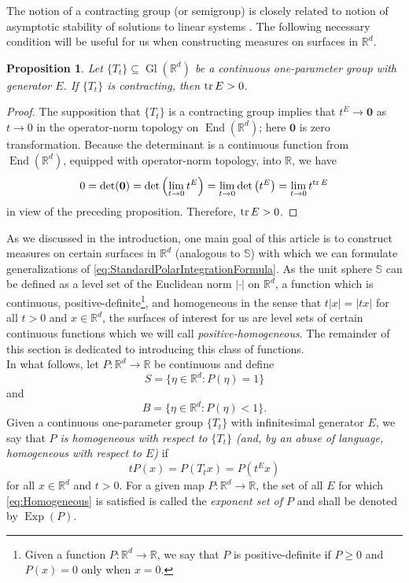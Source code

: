 \documentclass[11pt]{article}
\newtheorem{proposition}[theorem]{Proposition}
\newcommand\End{\operatorname{End}} %
\newcommand\Gl{\operatorname{Gl}} %
\newcommand\Exp{\operatorname{Exp}}
\renewcommand\det{\operatorname{det}}
\begin{document}
\noindent The notion of a contracting group (or semigroup) is closely related to notion of asymptotic stability of solutions to linear systems \cite{Braun1993}. The following necessary condition will be useful for us when constructing measures on surfaces in $\mathbb{R}^d$.

\begin{proposition}\label{prop:ContractingTrace}
Let $\{T_t\}\subseteq \Gl(\mathbb{R}^d)$ be a continuous one-parameter group with generator $E$. If $\{T_t\}$ is  contracting, then $\tr E>0$. 
\end{proposition}
\begin{proof}
The supposition that $\{T_t\}$ is a contracting group implies that $t^E\to \mathbf{0}$ as $t\to 0$ in the operator-norm topology on $\End(\mathbb{R}^d)$; here $\mathbf{0}$ is zero transformation. Because the determinant is a continuous function from $\End(\mathbb{R}^d)$, equipped with operator-norm topology, into $\mathbb{R}$, we have
\begin{equation*}
0=\det(\mathbf{0})=\det\left(\lim_{t\to 0}t^E\right)=\lim_{t\to 0}\det\left(t^E\right)=\lim_{t\to 0}t^{\tr E}
\end{equation*}
in view of the preceding proposition. Therefore, $\tr E>0$.
\end{proof}

\noindent As we discussed in the introduction, one main goal of this article is to construct measures on certain surfaces in $\mathbb{R}^d$ (analogous to $\mathbb{S}$) with which we can formulate generalizations of \eqref{eq:StandardPolarIntegrationFormula}. As the unit sphere $\mathbb{S}$ can be defined as a level set of the Euclidean norm $|\cdot|$ on $\mathbb{R}^d$, a function which is continuous,  positive-definite\footnote{Given a function $P:\mathbb{R}^d\to\mathbb{R}$, we say that $P$ is positive-definite if $P\geq 0$ and $P(x)=0$ only when $x=0$.}, and homogeneous in the sense that $t|x|=|tx|$ for all $t>0$ and $x\in\mathbb{R}^d$, the surfaces of interest for us are level sets of certain continuous functions which we will call \textit{positive-homogeneous}. The remainder of this section is dedicated to introducing this class of functions.\\

\noindent In what follows, let $P:\mathbb{R}^d\to\mathbb{R}$ be continuous and define
\begin{equation}
S=\{\eta\in\mathbb{R}^d:P(\eta)=1\}
\end{equation}
and
\begin{equation*}
B=\{\eta\in\mathbb{R}^d:P(\eta)<1\}.
\end{equation*}
Given a continuous one-parameter group $\{T_t\}$ with infinitesimal generator $E$, we say that \textit{$P$ is homogeneous with respect to $\{T_t\}$ (and, by an abuse of language, homogeneous with respect to $E$)} if
\begin{equation}\label{eq:Homogeneous}
tP(x)=P(T_tx)=P\left(t^Ex\right)
\end{equation}
for all $x\in\mathbb{R}^d$ and $t>0$. For a given map $P:\mathbb{R}^d\to\mathbb{R}$, the set of all $E$ for which \eqref{eq:Homogeneous} is satisfied is called the \textit{exponent set of $P$} and shall be denoted by $\Exp(P)$. 
\end{document}
